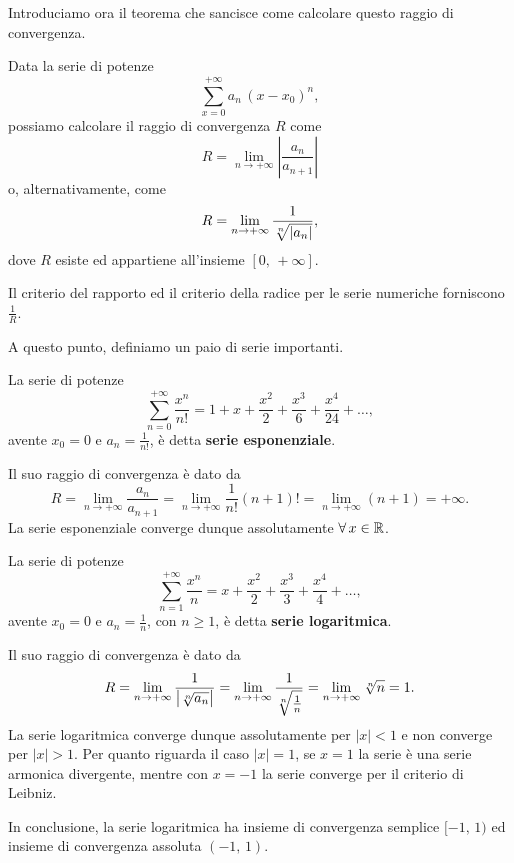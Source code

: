 \documentclass[../../analisi2]{subfiles}
\begin{document}
        Introduciamo ora il teorema che sancisce come calcolare questo raggio di convergenza.

        \begin{teorema}
            Data la serie di potenze 
            \[
                \sum_{x = 0}^{+\infty} a_n \, (x - x_0)^n,
            \]
            possiamo calcolare il raggio di convergenza \(R\) come
            \[
                R = \lim_{n \to +\infty} \left|\frac{a_n}{a_{n+1}}\right|
            \]
            o, alternativamente, come
            \[
                R = \lim_{n \to +\infty} \frac{1}{\sqrt[\leftroot{-1}n]{|a_n|}},
            \]
            dove \(R\) esiste ed appartiene all'insieme \([0, \, +\infty]\).
        \end{teorema}
        \begin{osservazione}
            Il criterio del rapporto ed il criterio della radice per le serie numeriche forniscono \(\frac{1}{R}\).
        \end{osservazione}

        A questo punto, definiamo un paio di serie importanti.

        \begin{definizione}
            La serie di potenze
            \[
                \sum_{n = 0}^{+\infty} \frac{x^n}{n!} = 1 + x + \frac{x^2}{2} + \frac{x^3}{6} + \frac{x^4}{24} + \ldots,
            \]
            avente \(x_0 = 0\) e \(a_n = \frac{1}{n!}\), è detta \textbf{serie esponenziale}.

            Il suo raggio di convergenza è dato da
            \[
                R = \lim_{n \to +\infty} \frac{a_n}{a_{n+1}} = \lim_{n \to +\infty} \frac{1}{n!} (n + 1)! = \lim_{n \to +\infty} (n + 1) = +\infty.
            \]
            La serie esponenziale converge dunque assolutamente \(\forall \, x \in \mathbb{R}\).
        \end{definizione}

        \begin{definizione}
            La serie di potenze
            \[
                \sum_{n = 1}^{+\infty} \frac{x^n}{n} = x + \frac{x^2}{2} + \frac{x^3}{3} + \frac{x^4}{4} + \ldots,
            \]
            avente \(x_0 = 0\) e \(a_n = \frac{1}{n}\), con \(n \geqslant 1\), è detta \textbf{serie logaritmica}.

            Il suo raggio di convergenza è dato da
            \[
                R = \lim_{n \to +\infty} \frac{1}{\left|\sqrt[\leftroot{-1}n]{a_n}\right|} = \lim_{n \to +\infty} \frac{1}{\sqrt[\leftroot{-1}n]{\frac{1}{n}}} = \lim_{n \to +\infty} \sqrt[\leftroot{-1}n]{n} = 1.
            \]
            La serie logaritmica converge dunque assolutamente per \(|x| < 1\) e non converge per \(|x| > 1\). Per quanto riguarda
            il caso \(|x| = 1\), se \(x = 1\) la serie è una serie armonica divergente, mentre con \(x = -1\) la serie converge
            per il criterio di Leibniz.

            In conclusione, la serie logaritmica ha insieme di convergenza semplice \([-1, \, 1)\) ed insieme di convergenza
            assoluta \((-1, \, 1)\).
        \end{definizione}
\end{document}

